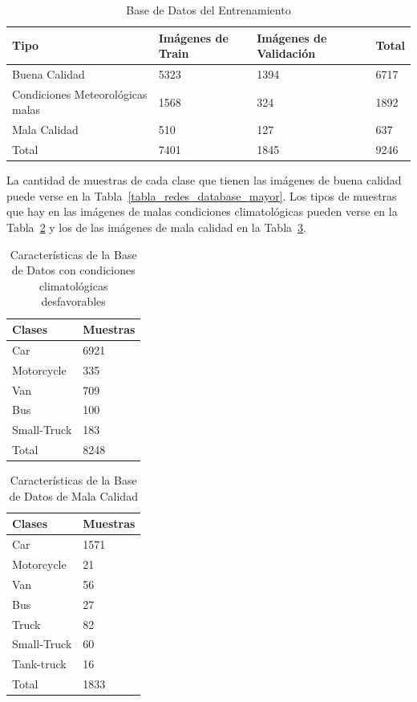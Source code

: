 \begin{table}[H]
\begin{center}
\begin{tabular}{|l|l|l|l|}
\hline
Tipo  & Imágenes de Train & Imágenes de Validación & Total \\
\hline \hline
Buena Calidad & 5323 &  1394 & 6717 \\ \hline
Condiciones Meteorológicas malas & 1568 & 324 & 1892 \\ \hline
Mala Calidad & 510 & 127 & 637 \\ \hline
Total & 7401 & 1845 & 9246 \\ \hline
\end{tabular}
\caption{Base de Datos del Entrenamiento}
\label{base_datos_final_train}
\end{center}
\end{table}

La cantidad de muestras de cada clase que tienen las imágenes de buena calidad puede verse en la Tabla~\ref{tabla_redes_database_mayor}. Los tipos de muestras que hay en las imágenes de malas condiciones climatológicas pueden verse en la Tabla~\ref{tabla_redes_database_malas_condiciones} y los de las imágenes de mala calidad en la Tabla~\ref{tabla_redes_database_mala_calidad}.

\begin{table}[H]
\begin{center}
\begin{tabular}{|l|l|}
\hline
Clases & Muestras \\
\hline \hline
Car & 6921 \\ \hline
Motorcycle & 335 \\ \hline
Van & 709 \\ \hline
Bus & 100 \\ \hline
Small-Truck & 183 \\ \hline
Total & 8248 \\ \hline
\end{tabular}
\caption{Características de la Base de Datos con condiciones climatológicas desfavorables}
\label{tabla_redes_database_malas_condiciones}
\end{center}
\end{table}

\begin{table}[H]
\begin{center}
\begin{tabular}{|l|l|}
\hline
Clases & Muestras \\
\hline \hline
Car & 1571 \\ \hline
Motorcycle & 21 \\ \hline
Van & 56 \\ \hline
Bus & 27 \\ \hline
Truck & 82 \\ \hline
Small-Truck & 60 \\ \hline
Tank-truck & 16 \\ \hline
Total & 1833 \\ \hline
\end{tabular}
\caption{Características de la Base de Datos de Mala Calidad}
\label{tabla_redes_database_mala_calidad}
\end{center}
\end{table}

